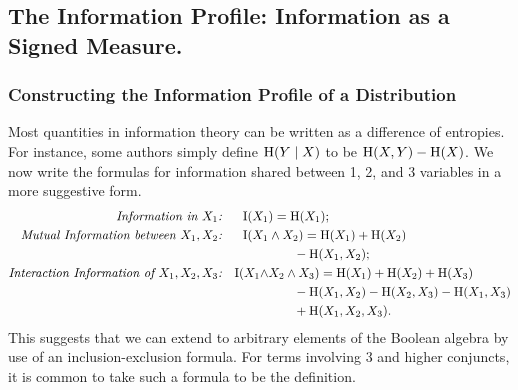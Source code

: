 \documentclass{article}
\begin{document}

    \subsection{The Information Profile: Information as a Signed Measure.}






    \subsubsection{Constructing the Information Profile of a Distribution}

    Most quantities in information theory can be written as a difference of entropies.
    For instance, some authors simply define $\operatorname{\mathrm{H}}(Y \mid X)$ to be $\operatorname{\mathrm{H}}(X,Y) - \operatorname{\mathrm{H}}(X)$.
    We now write the formulas for information shared between 1, 2, and 3 variables in a more suggestive form.
    \begin{align*}
        \textit{Information in $X_1$:}  && \operatorname{\mathrm{I}}(X_1 &) = \operatorname{\mathrm{H}}(X_1) ;\\
        \textit{Mutual Information between $X_1, X_2$:} && \operatorname{\mathrm{I}}(X_1 &\land X_2) = \operatorname{\mathrm{H}}(X_1) + \operatorname{\mathrm{H}}(X_2)  \\
             &&&\qquad - \operatorname{\mathrm{H}}(X_1, X_2); \\
         \textit{Interaction Information of $X_1, X_2, X_3$:}&&\operatorname{\mathrm{I}}(X_1 \land &X_2 \land X_3) = \operatorname{\mathrm{H}}(X_1) + \operatorname{\mathrm{H}}(X_2) + \operatorname{\mathrm{H}}(X_3) \\
            &&&\qquad - \operatorname{\mathrm{H}}(X_1, X_2) - \operatorname{\mathrm{H}}(X_2, X_3) - \operatorname{\mathrm{H}}(X_1, X_3) \\
            &&&\qquad  + \operatorname{\mathrm{H}}(X_1, X_2, X_3)  .\\
    \end{align*}
    This suggests that we can extend to arbitrary elements of the Boolean algebra by use of an inclusion-exclusion formula. For terms involving 3 and higher conjuncts, it is common to take such a formula to be the definition.
\end{document}
